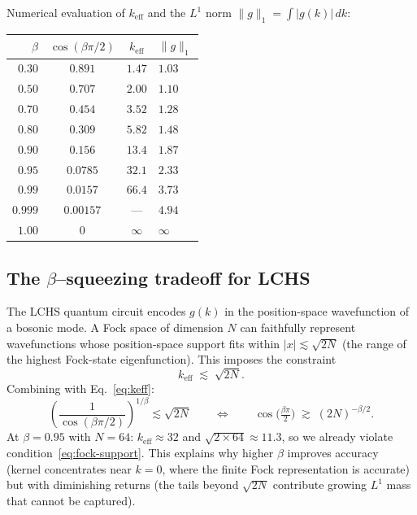 \documentclass[11pt]{article}
\begin{document}
Numerical evaluation of $k_{\mathrm{eff}}$ and the $L^1$ norm
$\|g\|_1 = \int |g(k)|\,dk$:

\begin{center}
\begin{tabular}{rccl}
  \toprule
  $\beta$ & $\cos(\beta\pi/2)$ & $k_{\mathrm{eff}}$ & $\|g\|_1$ \\
  \midrule
  $0.30$ & $0.891$ & $1.47$ & $1.03$ \\
  $0.50$ & $0.707$ & $2.00$ & $1.10$ \\
  $0.70$ & $0.454$ & $3.52$ & $1.28$ \\
  $0.80$ & $0.309$ & $5.82$ & $1.48$ \\
  $0.90$ & $0.156$ & $13.4$ & $1.87$ \\
  $0.95$ & $0.0785$ & $32.1$ & $2.33$ \\
  $0.99$ & $0.0157$ & $66.4$ & $3.73$ \\
  $0.999$ & $0.00157$ & --- & $4.94$ \\
  $1.00$ & $0$ & $\infty$ & $\infty$ \\
  \bottomrule
\end{tabular}
\end{center}

\subsection{The $\beta$--squeezing tradeoff for LCHS}

The LCHS quantum circuit encodes $g(k)$ in the position-space
wavefunction of a bosonic mode.  A Fock space of dimension $N$ can
faithfully represent wavefunctions whose position-space support fits
within $|x| \lesssim \sqrt{2N}$ (the range of the highest Fock-state
eigenfunction).  This imposes the constraint
\begin{equation}\label{eq:fock-support}
  k_{\mathrm{eff}} \;\lesssim\; \sqrt{2N}.
\end{equation}
Combining with Eq.~\eqref{eq:keff}:
\begin{equation}\label{eq:beta-N-constraint}
  \left(\frac{1}{\cos(\beta\pi/2)}\right)^{1/\beta} \lesssim \sqrt{2N}
  \qquad\Longleftrightarrow\qquad
  \cos\!\bigl(\tfrac{\beta\pi}{2}\bigr)
  \;\gtrsim\; (2N)^{-\beta/2}.
\end{equation}
At $\beta = 0.95$ with $N = 64$: $k_{\mathrm{eff}} \approx 32$ and
$\sqrt{2 \times 64} \approx 11.3$, so we already violate
condition~\eqref{eq:fock-support}.  This explains why higher $\beta$
improves accuracy (kernel concentrates near $k = 0$, where the finite
Fock representation is accurate) but with diminishing returns (the
tails beyond $\sqrt{2N}$ contribute growing $L^1$ mass that cannot
be captured).
\end{document}
